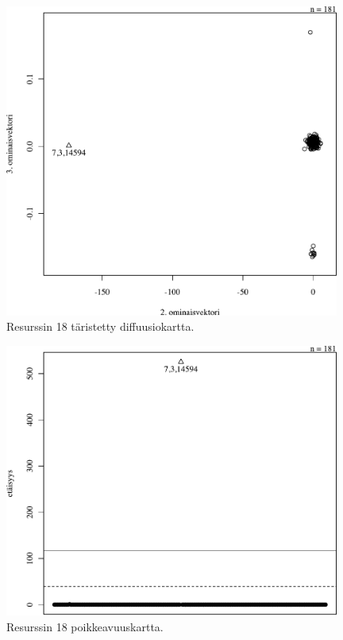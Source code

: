 \begin{figure}[p]
\centering
\includegraphics[width=11cm]{pics/diffuusiokuvat/service_18.pdf}
\caption{Resurssin 18 täristetty diffuusiokartta.}
\label{diffuusio_18}
\end{figure}

\begin{figure}[p]
\centering
\includegraphics[width=11cm]{pics/tiheyskuvat/service_18.pdf}
\caption{Resurssin 18 poikkeavuuskartta.}
\label{service_18}
\end{figure}

